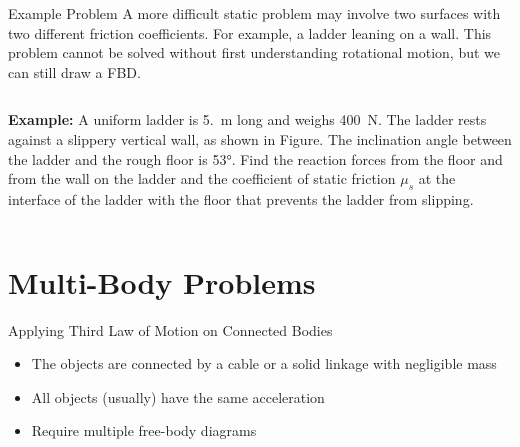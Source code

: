 \documentclass[12pt,compress,aspectratio=169]{beamer}
\begin{document}
\begin{frame}{Example Problem}
  A more difficult static problem may involve two surfaces with two different
  friction coefficients. For example, a ladder leaning on a wall. This problem
  cannot be solved without first understanding rotational motion, but we can
  still draw a FBD.
  \vspace{.2in}
  \begin{columns}
    \textbf{Example:} A uniform ladder is \SI{5.}{\metre} long and weighs
    \SI{400}{\newton}. The ladder rests against a slippery vertical wall, as
    shown in Figure. The inclination angle between the ladder and the rough
    floor is \ang{53}. Find the reaction forces from the floor and
    from the wall on the ladder and the coefficient of static friction $\mu_s$
    at the interface of the ladder with the floor that prevents the ladder from
    slipping.

  \end{columns}
\end{frame}



\section{Multi-Body Problems}

\begin{frame}{Applying Third Law of Motion on Connected Bodies}
  \begin{center}
  \end{center}
  \begin{itemize}
  \item The objects are connected by a cable or a solid linkage with negligible
    mass
  \item All objects (usually) have the same acceleration
  \item Require multiple free-body diagrams
  \end{itemize}
\end{frame}
\end{document}
